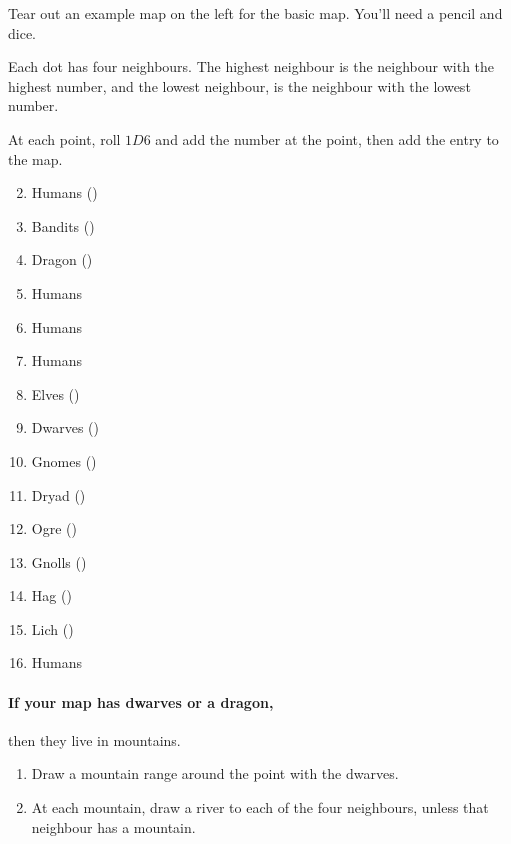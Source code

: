 \begin{multicols}{2}


Tear out an example map on the left for the basic map.
You'll need a pencil and dice.

Each dot has four neighbours.
The highest neighbour is the neighbour with the highest number, and the lowest neighbour, is the neighbour with the lowest number.

At each point, roll $1D6$ and add the number at the point, then add the entry to the map.

\begin{multicols}{2}

\begin{enumerate}
  \setcounter{enumi}{1}
  \item
  Humans
  ()
  \item
  Bandits
  ()
  \item
  Dragon
  ()
  \item
  Humans
  \item
  Humans
  \item
  Humans
  \item
  Elves
  ()
  \item
  Dwarves
  ()
  \item
  Gnomes
  ()
  \item
  Dryad
  ()
  \item
  Ogre
  ()
  \item
  Gnolls
  ()
  \item
  Hag
  ()
  \item
  Lich
  ()
  \item
  Humans
\end{enumerate}

\end{multicols}


\paragraph{If your map has dwarves or a dragon,}
then they live in mountains.

\begin{enumerate}
  \item
  Draw a mountain range around the point with the dwarves.
  \item
  At each mountain, draw a river to each of the four neighbours, unless that neighbour has a mountain.


\end{enumerate}
\end{multicols}
